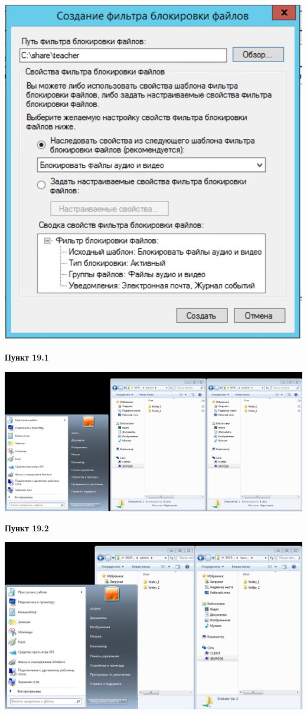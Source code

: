 \documentclass[a4paper,14pt]{extarticle}
\begin{document}
    \begin{center}
        \includegraphics[scale=0.4]{18.jpg}
    \end{center}
    \textbf{Пункт 19.1}
    \begin{center}
        \includegraphics[scale=0.45]{19.1}
    \end{center}
    \newpage
    \textbf{Пункт 19.2}
    \begin{center}
        \includegraphics[scale=0.5]{19.2}
    \end{center}
\end{document}
